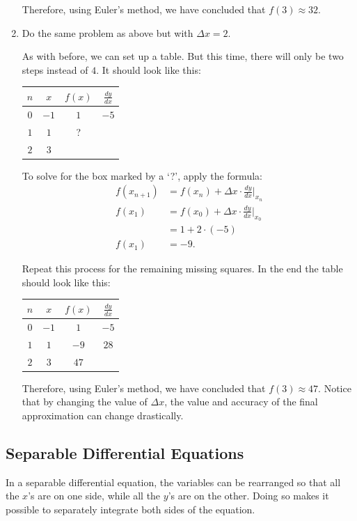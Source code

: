 \documentclass[12pt]{article}
\begin{document}
\begin{enumerate}
	Therefore, using Euler's method, we have concluded that $f(3) \approx 32$.

	\item Do the same problem as above but with $\Delta x = 2$.

	As with before, we can set up a table. But this time, there will only be two steps instead of $4$. It should look like this:
	\begin{table}[H]
		\centering
		\begin{tabular}{|c|c|c|c|}
			\hline
			$n$ & $x$ & $f(x)$ & $\frac{dy}{dx}$ \\
			\hline \hline
			$0$ & $-1$ & $1$ & $-5$ \\
			\hline
			$1$ & $1$ & ? & \\
			\hline
			$2$ & $3$ & & \\
			\hline
		\end{tabular}
	\end{table}

	To solve for the box marked by a `?', apply the formula:
	\begin{align*}
		f(x_{n + 1}) &= f(x_n) + \Delta x \cdot \frac{dy}{dx} \Big|_{x_n} \\[5pt]
		f(x_1) &= f(x_0) + \Delta x \cdot \frac{dy}{dx} \Big|_{x_0} \\[5pt]
		&= 1 + 2 \cdot (-5) \\
		f(x_1) &= -9.
	\end{align*}

	Repeat this process for the remaining missing squares. In the end the table should look like this:
	\begin{table}[H]
		\centering
		\begin{tabular}{|c|c|c|c|}
			\hline
			$n$ & $x$ & $f(x)$ & $\frac{dy}{dx}$ \\
			\hline \hline
			$0$ & $-1$ & $1$ & $-5$ \\
			\hline
			$1$ & $1$ & $-9$ & $28$ \\
			\hline
			$2$ & $3$ & $47$ & \\
			\hline
		\end{tabular}
	\end{table}

	Therefore, using Euler's method, we have concluded that $f(3) \approx 47$. Notice that by changing the value of $\Delta x$, the value and accuracy of the final approximation can change drastically.
\end{enumerate}

\subsection{Separable Differential Equations}
In a separable differential equation, the variables can be rearranged so that all the $x$'s are on one side, while all the $y$'s are on the other. Doing so makes it possible to separately integrate both sides of the equation.
\end{document}
